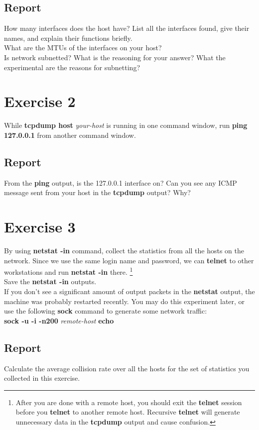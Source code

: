 \documentclass[10pt,a4paper]{article}
\numberwithin{equation}{section}
\numberwithin{figure}{section}
\numberwithin{table}{section}
\begin{document}
    \subsection*{Report}
    How many interfaces does the host have?
    List all the interfaces found, give their names, and explain their functions briefly. \\
    What are the MTUs of the interfaces on your host? \\
    Is network subnetted?
    What is the reasoning for your answer? What the experimental are the reasons for subnetting?


    \section{ Exercise 2}
    While \textbf{tcpdump host} \textit{your-host} is running in one command window, run \textbf{ping 127.0.0.1} from another command window.
    \subsection*{Report}
    From the \textbf{ping} output, is the 127.0.0.1 interface on?
    Can you see any ICMP message sent from your host in the \textbf{tcpdump} output?
    Why?


    \section{ Exercise 3}
    By using \textbf{netstat -in} command, collect the statistics from all the hosts on the network.
    Since we use the same login name and password, we can \textbf{telnet} to other workstations and run \textbf{netstat -in} there. \footnote{After you are done with a remote host, you should exit the \textbf{telnet} session before you \textbf{telnet} to another remote host.
    Recursive \textbf{telnet} will generate unnecessary data in the \textbf{tcpdump} output and cause confusion.} \\
    Save the \textbf{netstat -in} outputs. \\
    If you don’t see a significant amount of output packets in the \textbf{netstat} output, the machine was probably restarted recently. You may do this experiment later, or use the following \textbf{sock} command to generate some network traffic: \\
    \textbf{sock -u -i -n200} \textit{remote-host} \textbf{echo}
    \subsection*{Report}
    Calculate the average collision rate over all the hosts for the set of statistics you collected in this exercise.
\end{document}
